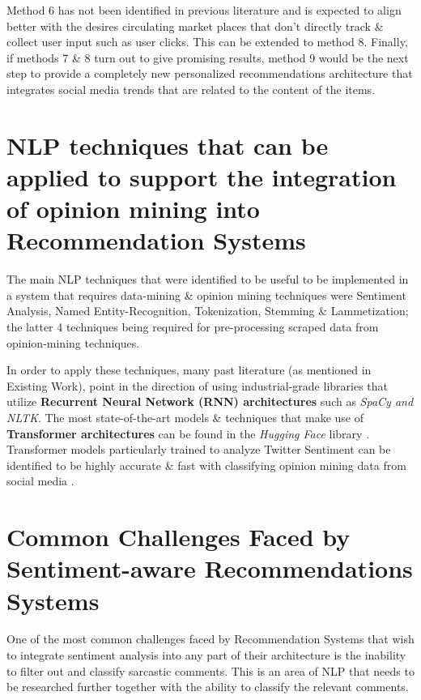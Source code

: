 \documentclass[manuscript,screen,review]{acmart}
\begin{document}
Method 6 has not been identified in previous literature and is expected to align better with the desires circulating market places that don't directly track \& collect user input such as user clicks. This can be extended to method 8. Finally, if methods 7 \& 8 turn out to give promising results, method 9 would be the next step to provide a completely new personalized recommendations architecture that integrates social media trends that are related to the content of the items.

\section{NLP techniques that can be applied to support the integration of opinion mining into Recommendation Systems}

The main NLP techniques that were identified to be useful to be implemented in a system that requires data-mining \& opinion mining techniques were Sentiment Analysis, Named Entity-Recognition, Tokenization, Stemming \& Lammetization; the latter 4 techniques being required for pre-processing scraped data from opinion-mining techniques.

In order to apply these techniques, many past literature (as mentioned in Existing Work), point in the direction of using industrial-grade libraries that utilize \textbf{Recurrent Neural Network (RNN) architectures} such as \textit{SpaCy and NLTK}. The most state-of-the-art models \& techniques that make use of \textbf{Transformer architectures} can be found in the \textit{Hugging Face} library \cite{wolf_transformers_2020}. Transformer models particularly trained to analyze Twitter Sentiment can be identified to be highly accurate \& fast with classifying opinion mining data from social media \cite{noauthor_cardiffnlptwitter-roberta-base-sentiment_nodate, barbieri_tweeteval_2020}.

\section{Common Challenges Faced by Sentiment-aware Recommendations Systems}
One of the most common challenges faced by Recommendation Systems that wish to integrate sentiment analysis into any part of their architecture is the inability to filter out and classify sarcastic comments. This is an area of NLP that needs to be researched further together with the ability to classify the relevant comments.
\end{document}
